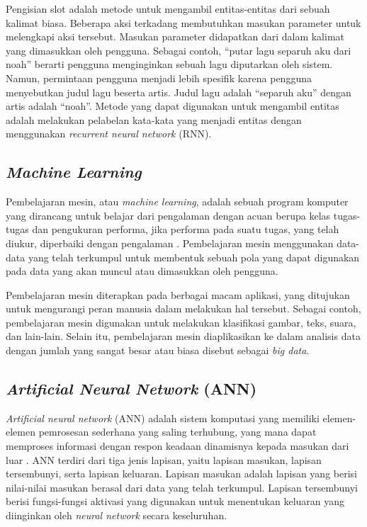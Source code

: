 Pengisian slot adalah metode untuk mengambil entitas-entitas dari sebuah kalimat biasa. Beberapa aksi terkadang membutuhkan masukan parameter untuk melengkapi aksi tersebut. Masukan parameter didapatkan dari dalam kalimat yang dimasukkan oleh pengguna. Sebagai contoh, “putar lagu separuh aku dari noah” berarti pengguna menginginkan sebuah lagu diputarkan oleh sistem. Namun, permintaan pengguna menjadi lebih spesifik karena pengguna menyebutkan judul lagu beserta artis. Judul lagu adalah “separuh aku” dengan artis adalah “noah”. Metode yang dapat digunakan untuk mengambil entitas adalah melakukan pelabelan kata-kata yang menjadi entitas dengan menggunakan \textit{recurrent neural network} (RNN).

\subsection{\textit{Machine Learning}}

Pembelajaran mesin, atau \textit{machine learning}, adalah sebuah program komputer yang dirancang untuk belajar dari pengalaman dengan acuan berupa kelas tugas-tugas dan pengukuran performa, jika performa pada suatu tugas, yang telah diukur, diperbaiki dengan pengalaman \parencite{mitchell1997machine}. Pembelajaran mesin menggunakan data-data yang telah terkumpul untuk membentuk sebuah pola yang dapat digunakan pada data yang akan muncul atau dimasukkan oleh pengguna.

Pembelajaran mesin diterapkan pada berbagai macam aplikasi, yang ditujukan untuk mengurangi peran manusia dalam melakukan hal tersebut. Sebagai contoh, pembelajaran mesin digunakan untuk melakukan klasifikasi gambar, teks, suara, dan lain-lain. Selain itu, pembelajaran mesin diaplikasikan ke dalam analisis data dengan jumlah yang sangat besar atau biasa disebut sebagai \textit{big data}.

\subsection{\textit{Artificial Neural Network} (ANN)}

\textit{Artificial neural network} (ANN) adalah sistem komputasi yang memiliki elemen-elemen pemrosesan sederhana yang saling terhubung, yang mana dapat memproses informasi dengan respon keadaan dinamisnya kepada masukan dari luar \parencite{caudill1987neural}. ANN terdiri dari tiga jenis lapisan, yaitu lapisan masukan, lapisan tersembunyi, serta lapisan keluaran. Lapisan masukan adalah lapisan yang berisi nilai-nilai masukan berasal dari data yang telah terkumpul. Lapisan tersembunyi berisi fungsi-fungsi aktivasi yang digunakan untuk menentukan keluaran yang diinginkan oleh \textit{neural network} secara keseluruhan.

